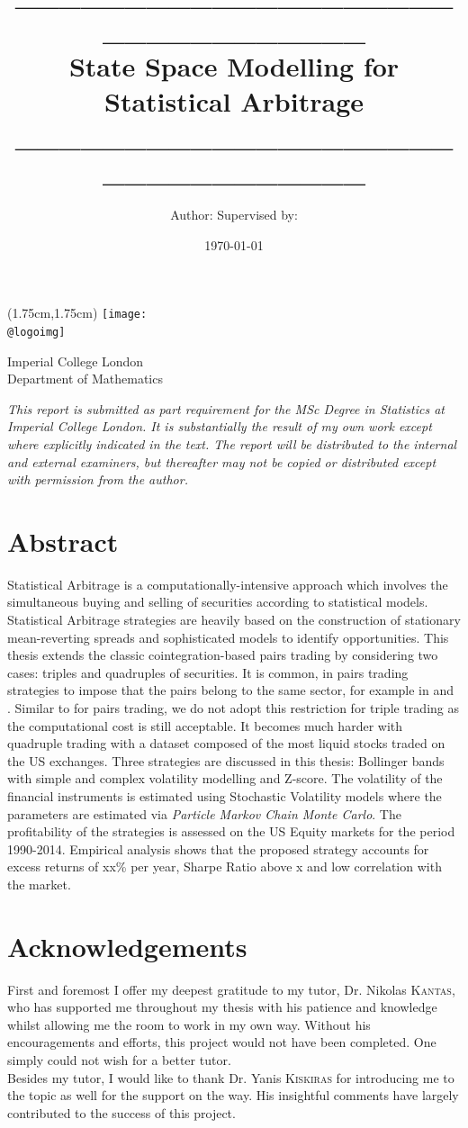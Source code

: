 \documentclass[11pt,a4,twosided,singlespacing,titlepagenumber=on]{scrreprt}
\title{\_\_\_\_\_\_\_\_\_\_\_\_\_\_\_\_\_\_\_\_\_\_\_\_\_\_\_\_\_\_\_\_ \\ State Space Modelling for Statistical Arbitrage \\ \_\_\_\_\_\_\_\_\_\_\_\_\_\_\_\_\_\_\_\_\_\_\_\_\_\_\_\_\_\_\_\_ }
\author{Author: \hfill Supervised by:}
\date{\today}
\makeatletter
\numberwithin{equation}{chapter} %
\theoremstyle{remark}
\renewcommand{\maketitle}{
\begin{titlepage}
\ifdefined\@logoimg
\begin{textblock*}{8cm}(1.75cm,1.75cm)
\texttt{[image: \\@logoimg]}
\end{textblock*}
\vspace*{1cm}

\vspace*{1cm}


\else
\fi
\begin{center}
\vspace*{\stretch{0.1}}
Imperial College London\\
Department of Mathematics\par
\vspace*{\stretch{1}} %
{\titlefont\Huge \@title\par} %
\vspace*{\stretch{2}}
{\large \textit{\@author} \par}
\vspace*{\stretch{0.1}}
{\large \@supervisor \par}
\vspace*{\stretch{3}}
\@date
\vspace*{\stretch{1}}

\end{center}%
\textit{
This report is submitted as part requirement for the MSc Degree in Statistics at Imperial College London. It is substantially the result of my own work except where explicitly indicated in the text. The report will be distributed to the internal and external examiners, but thereafter may not be copied or distributed except with permission from the author.}
\vspace*{\stretch{0.1}}
\end{titlepage}%
}
\makeatother
\begin{document}


\maketitle

\section*{Abstract}
Statistical Arbitrage is a computationally-intensive approach which involves the simultaneous buying and selling of securities according to statistical models. Statistical Arbitrage strategies are heavily based on the construction of stationary mean-reverting spreads and sophisticated models to identify opportunities. This thesis extends the classic cointegration-based pairs trading by considering two cases: triples and quadruples of securities. It is common, in pairs trading strategies to impose that the pairs belong to the same sector, for example in \cite{chan2009} and \cite{dunis2010}. Similar to \cite{caldeira2013} for pairs trading, we do not adopt this restriction for triple trading as the computational cost is still acceptable. It becomes much harder with quadruple trading with a dataset composed of the most liquid stocks traded on the US exchanges. Three strategies are discussed in this thesis: Bollinger bands with simple and complex volatility modelling and Z-score. The volatility of the financial instruments is estimated using Stochastic Volatility models where the parameters are estimated via \textit{Particle Markov Chain Monte Carlo}. The profitability of the strategies is assessed on the US Equity markets for the period 1990-2014. Empirical analysis shows that the proposed strategy accounts for excess returns of xx\% per year, Sharpe Ratio above x and low correlation with the market.

\section*{Acknowledgements}
First and foremost I offer my deepest gratitude to my tutor, Dr. Nikolas \textsc{Kantas}, who has supported me throughout my thesis with his patience and knowledge whilst allowing me the room to work in my own way. Without his encouragements and efforts, this project would not have been completed. One simply could not wish for a better tutor. \\

Besides my tutor, I would like to thank Dr. Yanis \textsc{Kiskiras} for introducing me to the topic as well for the support on the way. His insightful comments have largely contributed to the success of this project. \\
\end{document}
